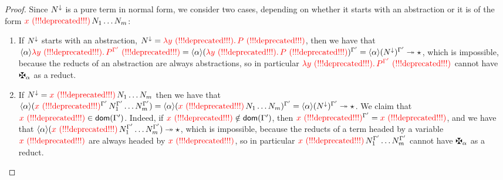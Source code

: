\begin{proof}
Since $N^\downarrow$ is a pure term in normal form, we consider two
cases, depending on whether it starts with an abstraction or it is of the form
$\textcolor{red}{x \text{\,\,(!!!deprecated!!!)}}\,N_1\hdots N_m$:
\begin{enumerate}
\item
  If $N^\downarrow$ starts with an abstraction,
  \ie $N^\downarrow = \textcolor{red}{\lambda \textcolor{red}{y \text{\,\,(!!!deprecated!!!)}}.\,P \text{\,\,(!!!deprecated!!!)}}$,
  then we have that
  $\langle\alpha\rangle\textcolor{red}{\lambda \textcolor{red}{y \text{\,\,(!!!deprecated!!!)}}.\,P^{\Gamma'} \text{\,\,(!!!deprecated!!!)}}
  = \langle\alpha\rangle(\textcolor{red}{\lambda \textcolor{red}{y \text{\,\,(!!!deprecated!!!)}}.\,P \text{\,\,(!!!deprecated!!!)}})^{\Gamma'}
  = \langle\alpha\rangle(N^\downarrow)^{\Gamma'}
  \twoheadrightarrow \star$,
  which is impossible,
  because the reducts of an abstraction are always abstractions,
  so in particular $\textcolor{red}{\lambda \textcolor{red}{y \text{\,\,(!!!deprecated!!!)}}.\,P^{\Gamma'} \text{\,\,(!!!deprecated!!!)}}$
  cannot have $\genbtyp$ as a reduct.
\item
  If $N^\downarrow = \textcolor{red}{x \text{\,\,(!!!deprecated!!!)}}\,N_1\hdots N_m$
  then we have that
  $\langle\alpha\rangle(\textcolor{red}{x \text{\,\,(!!!deprecated!!!)}}^{\Gamma'}\,N_1^{\Gamma'}\hdots N_m^{\Gamma'})
  = \langle\alpha\rangle(\textcolor{red}{x \text{\,\,(!!!deprecated!!!)}}\,N_1\hdots N_m)^{\Gamma'}
  = \langle\alpha\rangle(N^\downarrow)^{\Gamma'}
  \twoheadrightarrow \star$.
  We claim that $\textcolor{red}{x \text{\,\,(!!!deprecated!!!)}}\in\mathsf{dom}(\Gamma')$.
  Indeed, if $\textcolor{red}{x \text{\,\,(!!!deprecated!!!)}}\notin\mathsf{dom}(\Gamma')$, then $\textcolor{red}{x \text{\,\,(!!!deprecated!!!)}}^{\Gamma'} = \textcolor{red}{x \text{\,\,(!!!deprecated!!!)}}$,
  and we have that
  $\langle\alpha\rangle(\textcolor{red}{x \text{\,\,(!!!deprecated!!!)}}\,N_1^{\Gamma'}\hdots N_m^{\Gamma'})
   \twoheadrightarrow \star$,
  which is impossible,
  because the reducts of a term headed by a variable $\textcolor{red}{x \text{\,\,(!!!deprecated!!!)}}$
  are always headed by $\textcolor{red}{x \text{\,\,(!!!deprecated!!!)}}$,
  so in particular $\textcolor{red}{x \text{\,\,(!!!deprecated!!!)}}\,N_1^{\Gamma'}\hdots N_m^{\Gamma'}$
  cannot have $\genbtyp$ as a reduct.


\end{enumerate}
\end{proof}
